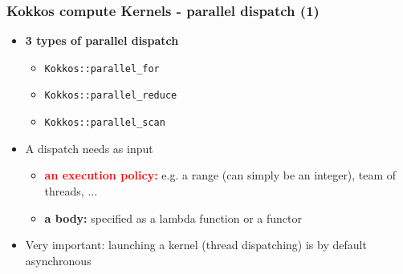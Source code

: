 \begin{frame}[fragile=singleslide]
  \frametitle{Kokkos compute Kernels - parallel dispatch (1)}

  \begin{itemize}
  \item \textbf{3 types of parallel dispatch}
    \begin{itemize}
    \item \texttt{Kokkos::parallel\_for}
    \item \texttt{Kokkos::parallel\_reduce}
    \item \texttt{Kokkos::parallel\_scan}
    \end{itemize}
  \item A dispatch needs as input
    \begin{itemize}
    \item \textcolor{red}{\textbf{an execution policy:}} e.g. a range (can simply be an integer), team of threads, ...
    \item \textbf{a body:} specified as a lambda function or a functor
    \end{itemize}
  \item Very important: launching a kernel (thread dispatching) is by default asynchronous
  \end{itemize}

\end{frame}

